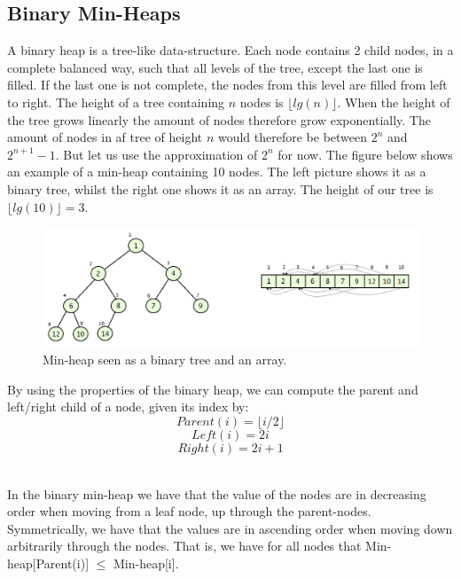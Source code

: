 \documentclass[11pt]{article}
\begin{document}
\subsection{Binary Min-Heaps}
A binary heap is a tree-like data-structure. Each node contains 2 child nodes, in a complete balanced way, such that all levels of the tree, except the last one is filled. If the last one is not complete, the nodes from this level are filled from left to right. The height of a tree containing $n$ nodes is $\lfloor lg(n) \rfloor$. When the height of the tree grows linearly the amount of nodes therefore grow exponentially. The amount of nodes in af tree of height $n$ would therefore be between $2^n$ and $2^{n+1}-1$. But let us use the approximation of $2^n$ for now. The figure below shows an example of a min-heap containing 10 nodes. The left picture shows it as a binary tree, whilst the right one shows it as an array. The height of our tree is $\lfloor lg(10) \rfloor = 3$.

\begin{figure}[H]
\centering
\includegraphics[scale=0.4]{Pictures/Heap and array.png}
\caption{Min-heap seen as a binary tree and an array.}
\end{figure}

\noindent By using the properties of the binary heap, we can compute the parent and left/right child of a node, given its index by:\\
$$Parent(i) = \lfloor i/2 \rfloor$$
$$Left(i) = 2i$$
$$Right(i) = 2i+1$$

\ \\In the binary min-heap we have that the value of the nodes are in decreasing order when moving from a leaf node, up through the parent-nodes. Symmetrically, we have that the values are in ascending order when moving down arbitrarily through the nodes. That is, we have for all nodes that Min-heap[Parent(i)] $\leq$ Min-heap[i].\\
\end{document}
